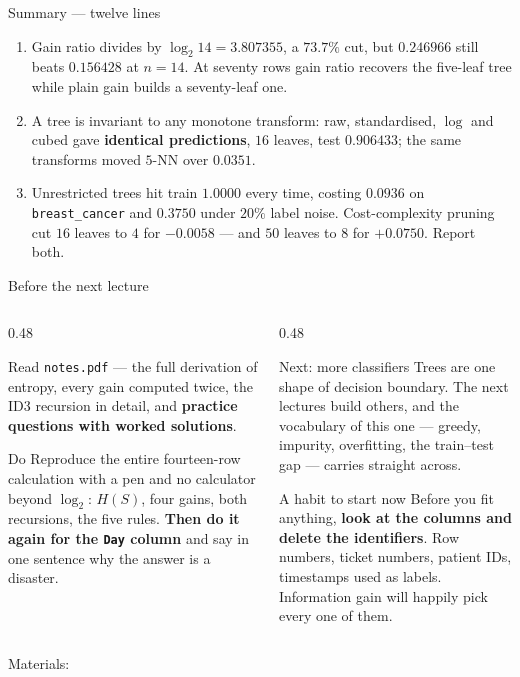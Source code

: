\documentclass[aspectratio=169]{beamer}
\begin{document}
\begin{frame}[shrink=17]{Summary --- twelve lines}
\begin{enumerate}
{      day}.
    \item Gain ratio divides by $\log_2 14 = 3.807355$, a $73.7\%$ cut, but
      $0.246966$ still beats $0.156428$ at $n=14$. At seventy rows gain ratio
      recovers the five-leaf tree while plain gain builds a seventy-leaf one.
    \item A tree is invariant to any monotone transform: raw, standardised,
      $\log$ and cubed gave \textbf{identical predictions}, $16$ leaves, test
      $0.906433$; the same transforms moved $5$-NN over $0.0351$.
    \item Unrestricted trees hit train $\mathbf{1.0000}$ every time, costing
      $0.0936$ on \texttt{breast\_cancer} and $0.3750$ under $20\%$ label
      noise. Cost-complexity pruning cut $16$ leaves to $4$ for $-0.0058$ ---
      and $50$ leaves to $8$ for $\mathbf{+0.0750}$. Report both.
  \end{enumerate}
\end{frame}

\begin{frame}[shrink=3]{Before the next lecture}
  \begin{columns}[T]
    \begin{column}{0.48\textwidth}
      \begin{block}{Read}
        \texttt{notes.pdf} --- the full derivation of entropy, every gain
        computed twice, the ID3 recursion in detail, and \textbf{practice
        questions with worked solutions}.
      \end{block}
      \begin{block}{Do}
        Reproduce the entire fourteen-row calculation with a pen and no
        calculator beyond $\log_2$: $H(S)$, four gains, both recursions, the
        five rules. \textbf{Then do it again for the \texttt{Day} column} and
        say in one sentence why the answer is a disaster.
      \end{block}
    \end{column}
    \begin{column}{0.48\textwidth}
      \begin{exampleblock}{Next: more classifiers}
        Trees are one shape of decision boundary. The next lectures build
        others, and the vocabulary of this one --- greedy, impurity,
        overfitting, the train--test gap --- carries straight across.
      \end{exampleblock}
      \begin{alertblock}{A habit to start now}
        Before you fit anything, \textbf{look at the columns and delete the
        identifiers}. Row numbers, ticket numbers, patient IDs, timestamps
        used as labels. Information gain will happily pick every one of them.
      \end{alertblock}
    \end{column}
  \end{columns}
  \begin{center}
    \small Materials: \texttt{\AMLRepoURL}
  \end{center}
  \slidesources{\AMLUnitVISources}
\end{frame}
\end{document}
